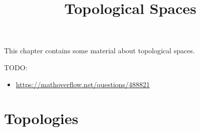 

%



\title{Topological Spaces}

\maketitle

\label{section-phantom}

This chapter contains some material about topological spaces.

\ChapterTableOfContents

TODO:
\begin{itemize}
    \item \url{https://mathoverflow.net/questions/488821}
\end{itemize}
\section{Topologies}\label{section-topologies}
